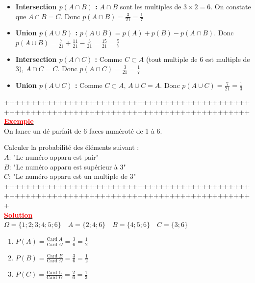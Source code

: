 \documentclass[12pt,a4paper]{article}
\begin{document}
\begin{itemize}
    \item \textbf{Intersection $p(A \cap B)$ :}
    $A \cap B$ sont les multiples de $3 \times 2 = 6$. On constate que $A \cap B = C$. Donc
    $ p(A \cap B) = \frac{3}{21} = \frac{1}{7} $

    \item \textbf{Union $p(A \cup B)$ :}
    $p(A \cup B) = p(A) + p(B) - p(A \cap B)$. Donc 
    $ p(A \cup B) = \frac{7}{21} + \frac{11}{21} - \frac{3}{21} = \frac{15}{21} = \frac{5}{7} $

    \item \textbf{Intersection $p(A \cap C)$ :}
    Comme $C \subset A$ (tout multiple de 6 est multiple de 3), $A \cap C = C$. Donc
    $ p(A \cap C) = \frac{3}{21} = \frac{1}{7} $

    \item \textbf{Union $p(A \cup C)$ :}
    Comme $C \subset A$, $A \cup C = A$. Donc
    $ p(A \cup C) = \frac{7}{21} = \frac{1}{3} $
\end{itemize}

++++++++++++++++++++++++++++++++++++++++++++++++++++++++++++++++++++++++++++++++++++++++++++\\

\underline{\textbf{\textcolor{red}{Exemple}}}\\

On lance un dé parfait de 6 faces numéroté de 1 à 6. 

Calculer la probabilité des éléments suivant : \\
$A$: "Le numéro apparu est pair" \\
$B$: "Le numéro apparu est supérieur à 3" \\
$C$: "Le numéro apparu est un multiple de 3" \\

+++++++++++++++++++++++++++++++++++++++++++++++++++++++++++++++++++++++++++++++++++++++++++++\\

\underline{\textbf{\textcolor{red}{Solution}}}\\

$\Omega = \{1; 2; 3; 4; 5; 6\} \quad A = \{2; 4; 6\} \quad B = \{4; 5; 6\} \quad C = \{3; 6\}$

\begin{enumerate}
    \item $P(A) = \frac{\text{Card } A}{\text{Card } \Omega} = \frac{3}{6} = \frac{1}{2}$
    \item $P(B) = \frac{\text{Card } B}{\text{Card } \Omega} = \frac{3}{6} = \frac{1}{2}$
    \item $P(C) = \frac{\text{Card } C}{\text{Card } \Omega} = \frac{2}{6} = \frac{1}{3}$
\end{enumerate}
\end{document}
